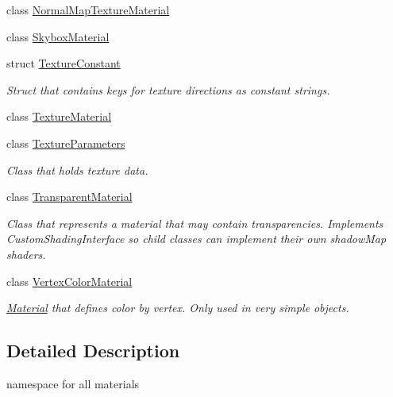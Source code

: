 \begin{DoxyCompactItemize}
class \mbox{\hyperlink{class_geometry_engine_1_1_geometry_material_1_1_normal_map_texture_material}{Normal\+Map\+Texture\+Material}}
\item 
class \mbox{\hyperlink{class_geometry_engine_1_1_geometry_material_1_1_skybox_material}{Skybox\+Material}}
\item 
struct \mbox{\hyperlink{struct_geometry_engine_1_1_geometry_material_1_1_texture_constant}{Texture\+Constant}}
\begin{DoxyCompactList}\small\item\em Struct that contains keys for texture directions as constant strings. \end{DoxyCompactList}\item 
class \mbox{\hyperlink{class_geometry_engine_1_1_geometry_material_1_1_texture_material}{Texture\+Material}}
\item 
class \mbox{\hyperlink{class_geometry_engine_1_1_geometry_material_1_1_texture_parameters}{Texture\+Parameters}}
\begin{DoxyCompactList}\small\item\em Class that holds texture data. \end{DoxyCompactList}\item 
class \mbox{\hyperlink{class_geometry_engine_1_1_geometry_material_1_1_transparent_material}{Transparent\+Material}}
\begin{DoxyCompactList}\small\item\em Class that represents a material that may contain transparencies. Implements Custom\+Shading\+Interface so child classes can implement their own shadow\+Map shaders. \end{DoxyCompactList}\item 
class \mbox{\hyperlink{class_geometry_engine_1_1_geometry_material_1_1_vertex_color_material}{Vertex\+Color\+Material}}
\begin{DoxyCompactList}\small\item\em \mbox{\hyperlink{class_geometry_engine_1_1_geometry_material_1_1_material}{Material}} that defines color by vertex. Only used in very simple objects. \end{DoxyCompactList}\end{DoxyCompactItemize}


\subsection{Detailed Description}
namespace for all materials 